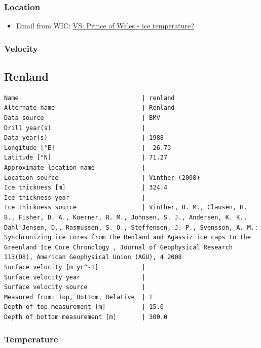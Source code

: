 \documentclass[article,a4paper,times,11pt,twoside]{article}
\begin{document}
\subsubsection{Location}
\label{sec:orge47cc7b}

\begin{itemize}
\item Email from WIC: \href{msgid:AM0PR04MB61293648564AB69ACA6A02CBA2F30@AM0PR04MB6129.eurprd04.prod.outlook.com}{VS: Prince of Wales - ice temperature?}
\end{itemize}

\subsubsection{Velocity}
\label{sec:org677411d}
\clearpage
\subsection{Renland}
\label{sec:orgc95ea14}
\begin{verbatim}
Name                                  | renland
Alternate name                        | Renland
Data source                           | BMV
Drill year(s)                         | 
Data year(s)                          | 1988
Longitude [°E]                        | -26.73
Latitude [°N]                         | 71.27
Approximate location name             | 
Location source                       | Vinther (2008)
Ice thickness [m]                     | 324.4
Ice thickness year                    | 
Ice thickness source                  | Vinther, B. M., Clausen, H. B., Fisher, D. A., Koerner, R. M., Johnsen, S. J., Andersen, K. K., Dahl-Jensen, D., Rasmussen, S. O., Steffensen, J. P., Svensson, A. M.: Synchronizing ice cores from the Renland and Agassiz ice caps to the Greenland Ice Core Chronology , Journal of Geophysical Research 113(D8), American Geophysical Union (AGU), 4 2008 
Surface velocity [m yr^-1]            | 
Surface velocity year                 | 
Surface velocity source               | 
Measured from: Top, Bottom, Relative  | T
Depth of top measurement [m]          | 15.0
Depth of bottom measurement [m]       | 300.0
\end{verbatim}

\subsubsection{Temperature}
\label{sec:org913b98c}
\end{document}
